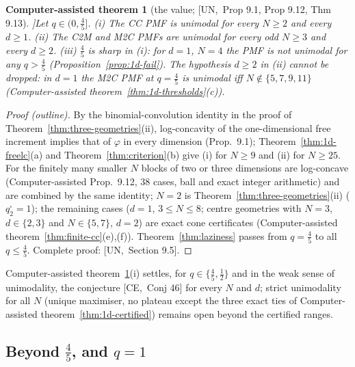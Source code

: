 \documentclass[10pt,a4paper]{article}
\theoremstyle{plain}
\newtheorem{catheorem}[theorem]{Computer-assisted theorem}
\theoremstyle{definition}
\newcommand{\src}[2]{[\textsf{#1},~#2]}           %
\newcommand{\UNI}{\textsf{UN}}
\newcommand{\CER}{\textsf{CE}}
\begin{document}
\begin{catheorem}[the value; \src{\UNI}{Prop 9.1, Prop 9.12, Thm 9.13}]\label{thm:four-fifths}
Let $q\in(0,\frac45]$.
(i) The CC PMF is unimodal for every $N\ge2$ and every $d\ge1$.
(ii) The C2M and M2C PMFs are unimodal for every odd $N\ge3$ and every $d\ge2$.
(iii) $\frac45$ is sharp in (i): for $d=1$, $N=4$ the PMF is not unimodal for any $q>\frac45$ (Proposition~\ref{prop:1d-fail}). The hypothesis $d\ge2$ in (ii) cannot be dropped: in $d=1$ the M2C PMF at $q=\frac45$ is unimodal iff $N\notin\{5,7,9,11\}$ (Computer-assisted theorem~\ref{thm:1d-thresholds}(c)).
\end{catheorem}
\begin{proof}[Proof (outline)]
By the binomial-convolution identity in the proof of Theorem~\ref{thm:three-geometries}(ii), log-concavity of the one-dimensional free increment implies that of $\varphi$ in every dimension (Prop.~9.1); Theorem~\ref{thm:1d-freelc}(a) and Theorem~\ref{thm:criterion}(b) give (i) for $N\ge9$ and (ii) for $N\ge25$. For the finitely many smaller $N$ blocks of two or three dimensions are log-concave (Computer-assisted Prop.~9.12, $38$ cases, ball and exact integer arithmetic) and are combined by the same identity; $N=2$ is Theorem~\ref{thm:three-geometries}(ii) ($q_2^\square=1$); the remaining cases ($d=1$, $3\le N\le8$; centre geometries with $N=3$, $d\in\{2,3\}$ and $N\in\{5,7\}$, $d=2$) are exact cone certificates (Computer-assisted theorem~\ref{thm:finite-cc}(e),(f)). Theorem~\ref{thm:laziness} passes from $q=\frac45$ to all $q\le\frac45$. Complete proof: \src{\UNI}{Section 9.5}.
\end{proof}
Computer-assisted theorem~\ref{thm:four-fifths}(i) settles, for $q\in\{\frac45,\frac12\}$ and in the weak sense of unimodality, the conjecture \src{\CER}{Conj 46} for every $N$ and $d$; strict unimodality for all $N$ (unique maximiser, no plateau except the three exact ties of Computer-assisted theorem~\ref{thm:1d-certified}) remains open beyond the certified ranges.

\subsection{Beyond $\frac45$, and $q=1$}
\end{document}
